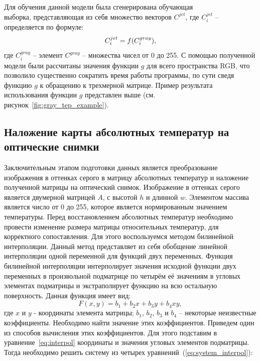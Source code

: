 \documentclass[14pt, a4paper]{extreport}
\begin{document}
	Для обучения данной модели была сгенерирована обучающая \\ выборка, представляющая из себя множество векторов $C^{jet}$, где $C^{jet}_{i}$ -- определяется по формуле:
	\vspace*{-0.3cm}
	\begin{equation}
		C^{jet}_{i} = f(C^{gray}_{i}),
		\label{eq:Cjetgray}
		\vspace*{-0.35cm}
	\end{equation}
	где $C^{gray}_{i}$ -- элемент $C^{gray}$ -- множества чисел от 0 до 255. С помощью полученной модели были рассчитаны значения функции $g$ для всего пространства RGB, что позволило существенно сократить время работы программы, по сути сведя функцию $g$ к обращению к трехмерной матрице. Пример результата использования функции $g$ представлен выше (см. рисунок~\ref{fig:gray_tep_example}).
	
\subsection[\vspace*{-0.22cm}Наложение карты абсолютных температур на оптические \\ \hspace*{-1.15cm}снимки]{\vspace*{-0.22cm}Наложение карты абсолютных температур на \\ \hspace*{-3.75cm}оптические снимки}	
	Заключительным этапом подготовки данных является преобразование изображения в оттенках серого в матрицу абсолютных температур и наложение полученной матрицы на оптический снимок. Изображение в оттенках серого является двумерной матрицей $A$, с высотой $h$ и длинной $w$. Элементом массива является число от 0 до 255, которое является нормированным значением температуры.
	Перед восстановлением абсолютных температур необходимо провести изменение размера матрицы относительных температур, для корректного сопоставления. Для этого воспользуемся методом билинейной интерполяции. Данный метод представляет из себя обобщение линейной интерполяции одной переменной для функций двух переменных. Функция билинейной интерполяции интерполирует значения исходной функции двух переменных в произвольной подматрице по четырём её значениям в угловых элементах подматрицы и экстраполирует функцию на всю остальную поверхность. Данная функция имеет вид: 
	\begin{equation}
		F(x,y)=b_{1}+b_{2} x+b_{3} y+b_{4} x y,
		\label{eq:interpol}
	\end{equation}
	где $x$ и $y$ - координаты элемента матрицы; $b_1$, $b_2$, $b_3$ и $b_4$ -- некоторые неизвестные коэффициенты. Необходимо найти значение этих коэффициентов. Приведем один из способов вычисления этих коэффициентов. Для этого подставим в уравнение~\ref{eq:interpol} координаты и значения угловых 
	элементов подматрицы. Тогда необходимо решить систему из четырех уравнений~(\ref{eq:system_interpol}):
	
\end{document}
